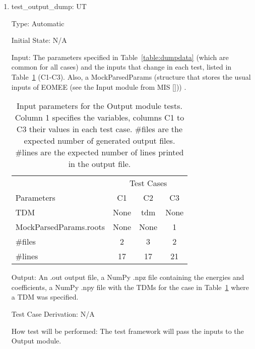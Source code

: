\documentclass[12pt, titlepage]{article}
\newcounter{utnum} %
\begin{document}
\begin{enumerate}
	
	\item{test\_output\_dump: UT\theutnum 
		\label{UT11}\\}
	
	Type: Automatic
	
	Initial State: N/A
	
	Input: The parameters specified in Table~\ref{table:dumpdata} (which are 
	common for all cases) and the inputs that change in each test, listed in 
	Table~\ref{table:dumpcases} (C1-C3). Also, a MockParsedParams (structure 
	that stores the usual inputs of EOMEE (see the Input module from MIS 
	[\cite{MIS2020}]))  .
	\begin{table}[h!]
		\centering
		\begin{tabular}{lccc}
			                       & \multicolumn{3}{c}{Test Cases} \\
			Parameters             &  C1  &  C2  &        C3        \\
			\toprule
			TDM                    & None & tdm  &       None       \\
			MockParsedParams.roots & None & None &        1         \\
			\#files                &  2   &  3   &        2         \\
			\#lines                &  17  &  17  &        21\\
			\bottomrule
		\end{tabular}
		\caption{Input parameters for the Output module tests. Column 1 
		specifies the variables, columns C1 to C3 their values in each test 
		case. \#files are the expected number of generated output files. 
		\#lines are the expected number of lines printed in the output file.}
		\label{table:dumpcases}
	\end{table}
	
	Output: An .out output file, a NumPy .npz file containing the energies and 
	coefficients, a NumPy .npy file with the TDMs for the case in 
	Table~\ref{table:dumpcases} where a TDM was specified.
	
	Test Case Derivation: N/A
	
	How test will be performed: The test framework will pass the inputs to the 
	Output module.
	
\end{enumerate}

%
\end{document}
